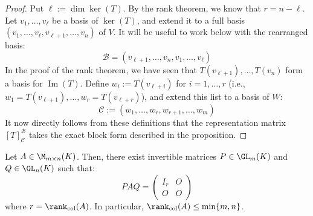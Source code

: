 \begin{proof}
Put $\ell := \dim \ker(T)$. By the rank theorem, we know that $r = n - \ell$. Let $v_1, \dots, v_\ell$ be a basis of $\ker(T)$, and extend it to a full basis $(v_1, \dots, v_\ell, v_{\ell+1}, \dots, v_n)$ of $V$. It will be useful to work below with the rearranged basis:
\begin{equation*}
    \mathcal{B} = (v_{\ell+1}, \dots, v_n, v_1, \dots, v_\ell)
\end{equation*}
In the proof of the rank theorem, we have seen that $T(v_{\ell+1}), \dots, T(v_n)$ form a basis for $\operatorname{Im}(T)$. Define $w_i := T(v_{\ell+i})$ for $i = 1, \dots, r$ (i.e., $w_1 = T(v_{\ell+1}), \dots, w_r = T(v_{\ell+r})$), and extend this list to a basis of $W$:
\begin{equation*}
    \mathcal{C} := (w_1, \dots, w_r, w_{r+1}, \dots, w_m)
\end{equation*}
It now directly follows from these definitions that the representation matrix $[T]_{\mathcal{C}}^{\mathcal{B}}$ takes the exact block form described in the proposition.
\end{proof}

\begin{corollary}
\label{cor:matrix_equivalence_normal_form}
Let $A \in \M_{m \times n}(K)$. Then, there exist invertible matrices $P \in \GL_m(K)$ and $Q \in \GL_n(K)$ such that:
\begin{equation*}
    PAQ = \begin{pmatrix} I_r & O \\ O & O \end{pmatrix}
\end{equation*}
where $r = \rank_{\text{col}}(A)$. In particular, $\rank_{\text{col}}(A) \le \min\{m, n\}$.
\end{corollary}

